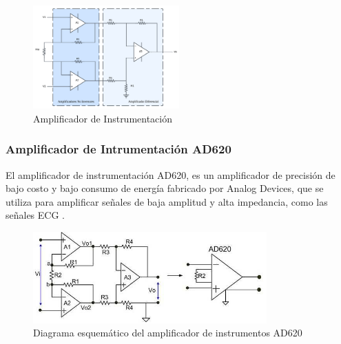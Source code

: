             \begin{figure} [H]
                \centering
                \includegraphics[width=0.5\textwidth]{img/Marco/Amplificador_Intrumentacion.png}
                \caption[Amplificador de Instrumentación]{Amplificador de Instrumentación\footnotemark}
                \label{fig:Amplificador_Instrumentacion}
            \end{figure}

        \subsubsection{Amplificador de Intrumentación AD620}
            El amplificador de instrumentación AD620, es un amplificador de precisión de bajo costo y bajo consumo de energía fabricado por Analog Devices, que se utiliza para amplificar señales de baja amplitud y alta impedancia, como las señales ECG \cite{AD620_AnalogDevices,AD620_DigiKey}.

            \begin{figure}[H]
                \centering
                \includegraphics[width=0.8\textwidth]{img/Marco/AD620.png}
                \caption[Diagrama esquemático del amplificador de instrumentos AD620.]{Diagrama esquemático del amplificador de instrumentos AD620\footnotemark}
                \label{fig:AD620}
            \end{figure}

